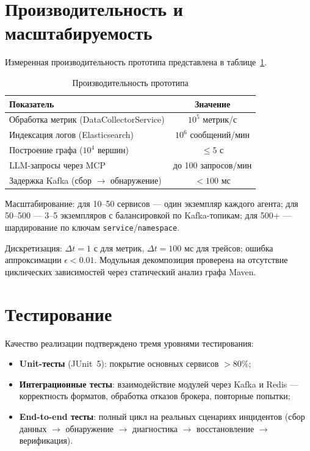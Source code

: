 \section{Производительность и масштабируемость}

Измеренная производительность прототипа представлена в таблице~\ref{tab:prototype_performance}.

\begin{table}[H]
\centering
\caption{Производительность прототипа}
\label{tab:prototype_performance}
\begin{tabular}{|p{6cm}|c|}
\hline
\textbf{Показатель} & \textbf{Значение} \\
\hline
Обработка метрик (DataCollectorService) & $10^5$ метрик/с \\
\hline
Индексация логов (Elasticsearch) & $10^6$ сообщений/мин \\
\hline
Построение графа ($10^4$ вершин) & $\leq 5$ с \\
\hline
LLM-запросы через MCP & до 100 запросов/мин \\
\hline
Задержка Kafka (сбор $\to$ обнаружение) & $< 100$ мс \\
\hline
\end{tabular}
\end{table}

Масштабирование: для 10--50 сервисов --- один экземпляр каждого агента; для 50--500 --- 3--5 экземпляров с балансировкой по Kafka-топикам; для 500+ --- шардирование по ключам \texttt{service}/\texttt{namespace}.

Дискретизация: $\Delta t = 1$ с для метрик, $\Delta t = 100$ мс для трейсов; ошибка аппроксимации $\epsilon < 0.01$. Модульная декомпозиция проверена на отсутствие циклических зависимостей через статический анализ графа Maven.

\section{Тестирование}

Качество реализации подтверждено тремя уровнями тестирования:
\begin{itemize}
  \item \textbf{Unit-тесты} (JUnit~5): покрытие основных сервисов $> 80\%$;
  \item \textbf{Интеграционные тесты}: взаимодействие модулей через Kafka и Redis --- корректность форматов, обработка отказов брокера, повторные попытки;
  \item \textbf{End-to-end тесты}: полный цикл на реальных сценариях инцидентов (сбор данных $\rightarrow$ обнаружение $\rightarrow$ диагностика $\rightarrow$ восстановление $\rightarrow$ верификация).
\end{itemize}

